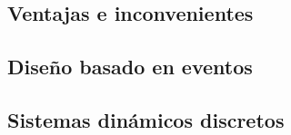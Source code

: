 \subsection{Ventajas e inconvenientes}


\subsection{Diseño basado en eventos}

\subsection{Sistemas dinámicos discretos}

